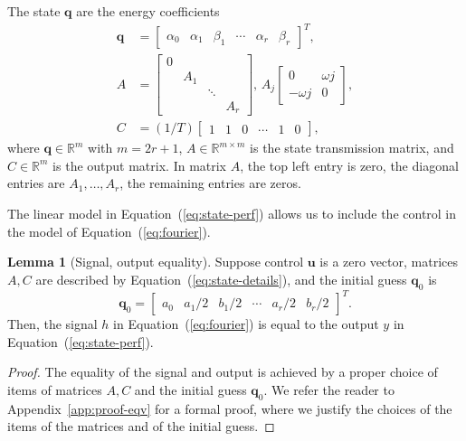 \documentclass[letterpaper,10pt,conference]{ieeeconf}
\theoremstyle{definition}
\newtheorem{lem}[thm]{Lemma}
\begin{document}
The state $\mathbf{q}$ are the energy coefficients
\begin{equation}\label{eq:state-details}\begin{split}
  \mathbf{q}&=\left[\begin{array}{cccccc}
    \alpha_0 & \alpha_1 & \beta_1 & \cdots & \alpha_r & \beta_r
  \end{array}\right]^T,\\
  A&=\left[\begin{array}{cccc}
    0&    &       &  \\
     & A_1&       &  \\
     &    & \ddots&  \\
     &    &       & A_r 
  \end{array}\right],\,A_j\begin{bmatrix}0 & \omega j \\ -\omega j & 0\end{bmatrix},\\
  C&=(1/T)\left[\begin{array}{cccccc}
    1 & 1 & 0 &\cdots & 1 & 0
  \end{array}\right],
\end{split}\end{equation}
where $\mathbf{q}\in\mathbb{R}^m$ with $m=2r+1$, $A\in\mathbb{R}^{m\times m}$ is the state transmission matrix, and $C\in\mathbb{R}^m$ is the output matrix. In matrix $A$, the top left entry is zero, the diagonal entries are $A_1,\dots,A_r$, the remaining entries are zeros.

The linear model in Equation~(\ref{eq:state-perf}) allows us to include the control in the model of Equation~(\ref{eq:fourier}).

\begin{lem}[Signal, output equality]\label{lem:eqv}Suppose control $\mathbf{u}$ is a zero vector, matrices $A,C$ are described by Equation~(\ref{eq:state-details}), and the initial guess $\mathbf{q}_0$ is 
  \begin{equation*}
  \mathbf{q}_0=\begin{bmatrix}a_0 & a_1/2 & b_1/2 & \cdots & a_r/2 & b_r/2\end{bmatrix}^T.
  \end{equation*} 
  Then, the signal $h$ in Equation~(\ref{eq:fourier}) is equal to the output $y$ in Equation~(\ref{eq:state-perf}).
\end{lem}
\begin{proof}
The equality of the signal and output is achieved by a proper choice of items of matrices $A,C$ and the initial guess $\mathbf{q}_0$. We refer the reader to Appendix~\ref{app:proof-eqv} for a formal proof, where we justify the choices of the items of the matrices and of the initial guess. 
\end{proof}
\end{document}
